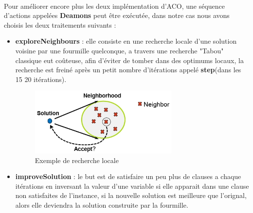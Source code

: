 	\paragraph{}
	Pour améliorer encore plus les deux implémentation d'ACO, une séquence d'actions appelées \textbf{Deamons} peut être exécutée, dans notre cas nous avons choisis les deux traitements suivants : 
	\begin{itemize}
		\item \textbf{exploreNeighbours} : elle consiste en une recherche locale d'une solution voisine par une fourmille quelconque, a travers une recherche "Tabou" classique eut coûteuse, afin d'éviter de tomber dans des optimums locaux, la recherche est freiné après un petit nombre d'itérations appelé \textbf{step}(dans les 15 20 itérations).
		\begin{figure}[H]
			\centering
			\includegraphics[width=0.7\textwidth]{images/localSearch.jpg}
			\caption{Exemple de recherche locale}
		\end{figure}
		\item \textbf{improveSolution} : le but est de  satisfaire un peu plus de clauses a chaque itérations en inversant la valeur d'une variable si elle apparait dans une clause non satisfaites de l'instance, si la nouvelle solution est meilleure que l'orignal, alors elle deviendra la solution construite par la fourmille.
	\end{itemize}
